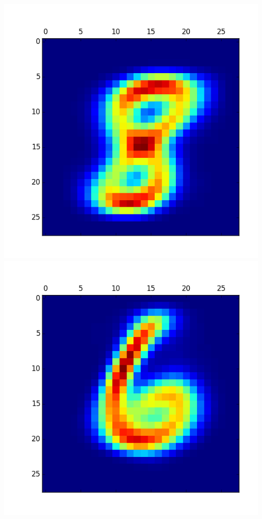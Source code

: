 \documentclass[11pt]{article}
\begin{document}
\begin{itemize}
\includegraphics[scale = 0.5]{24.png}
\includegraphics[scale = 0.5]{25.png}


\end{itemize}
\end{document}
